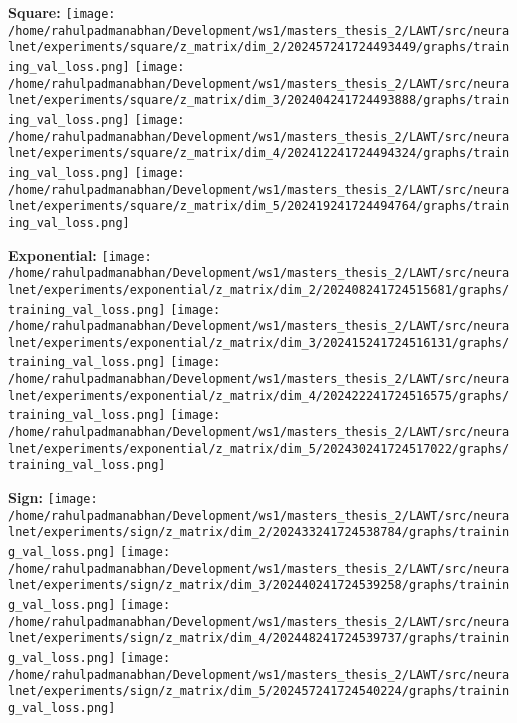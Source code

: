 \documentclass{article}
\begin{document}
\textbf{Square:}
\texttt{[image: /home/rahulpadmanabhan/Development/ws1/masters\_thesis\_2/LAWT/src/neuralnet/experiments/square/z\_matrix/dim\_2/202457241724493449/graphs/training\_val\_loss.png]}
\texttt{[image: /home/rahulpadmanabhan/Development/ws1/masters\_thesis\_2/LAWT/src/neuralnet/experiments/square/z\_matrix/dim\_3/202404241724493888/graphs/training\_val\_loss.png]}
\texttt{[image: /home/rahulpadmanabhan/Development/ws1/masters\_thesis\_2/LAWT/src/neuralnet/experiments/square/z\_matrix/dim\_4/202412241724494324/graphs/training\_val\_loss.png]}
\texttt{[image: /home/rahulpadmanabhan/Development/ws1/masters\_thesis\_2/LAWT/src/neuralnet/experiments/square/z\_matrix/dim\_5/202419241724494764/graphs/training\_val\_loss.png]}

\textbf{Exponential:}
\texttt{[image: /home/rahulpadmanabhan/Development/ws1/masters\_thesis\_2/LAWT/src/neuralnet/experiments/exponential/z\_matrix/dim\_2/202408241724515681/graphs/training\_val\_loss.png]}
\texttt{[image: /home/rahulpadmanabhan/Development/ws1/masters\_thesis\_2/LAWT/src/neuralnet/experiments/exponential/z\_matrix/dim\_3/202415241724516131/graphs/training\_val\_loss.png]}
\texttt{[image: /home/rahulpadmanabhan/Development/ws1/masters\_thesis\_2/LAWT/src/neuralnet/experiments/exponential/z\_matrix/dim\_4/202422241724516575/graphs/training\_val\_loss.png]}
\texttt{[image: /home/rahulpadmanabhan/Development/ws1/masters\_thesis\_2/LAWT/src/neuralnet/experiments/exponential/z\_matrix/dim\_5/202430241724517022/graphs/training\_val\_loss.png]}

\textbf{Sign:}
\texttt{[image: /home/rahulpadmanabhan/Development/ws1/masters\_thesis\_2/LAWT/src/neuralnet/experiments/sign/z\_matrix/dim\_2/202433241724538784/graphs/training\_val\_loss.png]}
\texttt{[image: /home/rahulpadmanabhan/Development/ws1/masters\_thesis\_2/LAWT/src/neuralnet/experiments/sign/z\_matrix/dim\_3/202440241724539258/graphs/training\_val\_loss.png]}
\texttt{[image: /home/rahulpadmanabhan/Development/ws1/masters\_thesis\_2/LAWT/src/neuralnet/experiments/sign/z\_matrix/dim\_4/202448241724539737/graphs/training\_val\_loss.png]}
\texttt{[image: /home/rahulpadmanabhan/Development/ws1/masters\_thesis\_2/LAWT/src/neuralnet/experiments/sign/z\_matrix/dim\_5/202457241724540224/graphs/training\_val\_loss.png]}
\end{document}

